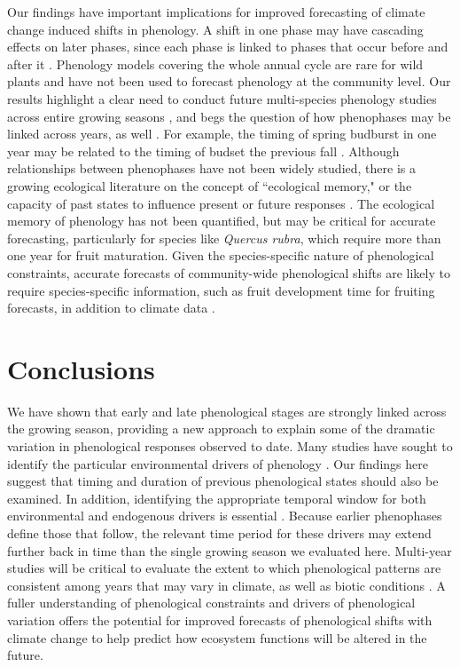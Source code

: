 \documentclass{article}
\begin{document}
\par Our findings have important implications for improved forecasting of climate change induced shifts in phenology. A shift in one phase may have cascading effects on later phases, since each phase is linked to phases that occur before and after it \citep{wolkovich2014b}. Phenology models covering the whole annual cycle are rare for wild plants \citep[but see][]{chuine2001} and have not been used to forecast phenology at the community level. Our results highlight a clear need to conduct future multi-species phenology studies across entire growing seasons \citep{wolkovich2014}, and begs the question of how phenophases may be linked across years, as well \citep[e.g.,][]{elmendorf2016}. For example, the timing of spring budburst in one year may be related to the timing of budset the previous fall \citep {mimura2010}. Although relationships between phenophases have not been widely studied, there is a growing ecological literature on the concept of ``ecological memory," or the capacity of past states to influence present or future responses \citep {ogle2015}. The ecological memory of phenology has not been quantified, but may be critical for accurate forecasting, particularly for species like \emph{Quercus rubra}, which require more than one year for fruit maturation. Given the species-specific nature of phenological constraints, accurate forecasts of community-wide phenological shifts are likely to require species-specific information, such as fruit development time for fruiting forecasts, in addition to climate data \citep{diez2012}.

\section* {Conclusions}
We have shown that early and late phenological stages are strongly linked across the growing season, providing a new approach to explain some of the dramatic variation in phenological responses observed to date. Many studies have sought to identify the particular environmental drivers of phenology \citep [e.g.,][]{morin2010,schwartz2013}. Our findings here suggest that timing and duration of previous phenological states should also be examined. In addition, identifying the appropriate temporal window for both environmental and endogenous drivers is essential \citep{teller2016}. Because earlier phenophases define those that follow, the relevant time period for these drivers may extend further back in time than the single growing season we evaluated here. Multi-year studies will be critical to evaluate the extent to which phenological patterns are consistent among years that may vary in climate, as well as biotic conditions \citep [i.e., pollinator or pest populations,][]{lechowicz1995}. %
A fuller understanding of phenological constraints and drivers of phenological variation offers the potential for improved forecasts of phenological shifts with climate change to help predict how ecosystem functions will be altered in the future. 
\end{document}
